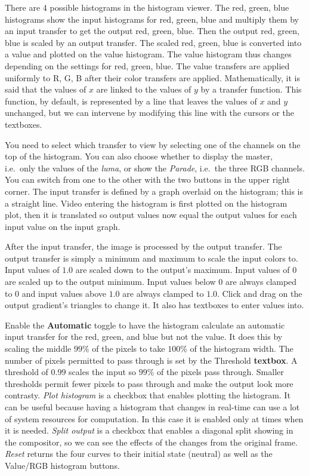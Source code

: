 There are 4 possible histograms in the histogram viewer. The red, green, blue histograms show the input histograms for red, green, blue and multiply them by an input transfer to get the output red, green, blue. Then the output red, green, blue is scaled by an output transfer. The scaled red, green, blue is converted into a value and plotted on the value histogram. The value histogram thus changes depending on the settings for red, green, blue. The value transfers are applied uniformly to R, G, B after their color transfers are applied. Mathematically, it is said that the values of $x$ are linked to the values of $y$ by a transfer function. This function, by default, is represented by a line that leaves the values of $x$ and $y$ unchanged, but we can intervene by modifying this line with the cursors or the textboxes.

You need to select which transfer to view by selecting one of the channels on the top of the histogram. You can also choose whether to display the master, i.e.\ only the values of the \textit{luma}, or show the \textit{Parade}, i.e.\ the three RGB channels. You can switch from one to the other with the two buttons in the upper right corner. The input transfer is defined by a graph overlaid on the histogram; this is a straight line. Video entering the histogram is first plotted on the histogram plot, then it is translated so output values now equal the output values for each input value on the input graph.

After the input transfer, the image is processed by the output transfer. The output transfer is simply a minimum and maximum to scale the input colors to. Input values of $1.0$ are scaled down to the output's maximum. Input values of $0$ are scaled up to the output minimum. Input values below $0$ are always clamped to $0$ and input values above $1.0$ are always clamped to $1.0$. Click and drag on the output gradient's triangles to change it. It also has textboxes to enter values into.

Enable the \textbf{Automatic} toggle to have the histogram calculate an automatic input transfer for the red, green, and blue but not the value. It does this by scaling the middle $99\%$ of the pixels to take $100\%$ of the histogram width. The number of pixels permitted to pass through is set by the Threshold \textbf{textbox}. A threshold of $0.99$ scales the input so $99\%$ of the pixels pass through. Smaller thresholds permit fewer pixels to pass through and make the output look more contrasty.
\textit{Plot histogram} is a checkbox that enables plotting the histogram. It can be useful because having a histogram that changes in real-time can use a lot of system resources for computation. In this case it is enabled only at times when it is needed.
\textit{Split output} is a checkbox that enables a diagonal split showing in the compositor, so we can see the effects of the changes from the original frame.
\textit{Reset} returns the four curves to their initial state (neutral) as well as the Value/RGB histogram buttons.

